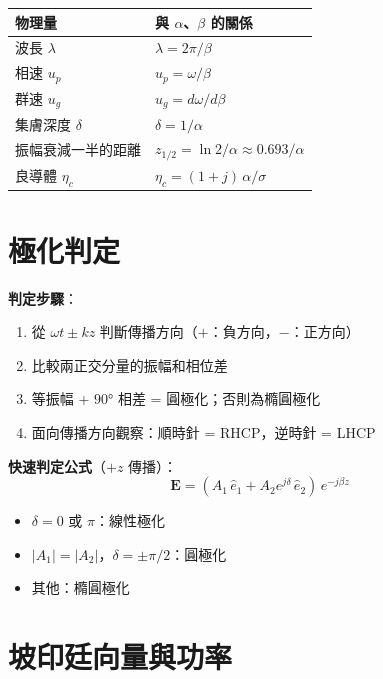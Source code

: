 \documentclass[12pt,a4paper]{article}
\newcommand{\vE}{\mathbf{E}}
\begin{document}
\begin{formulabox}
\begin{center}
\begin{tabular}{ll}
\toprule
\textbf{物理量} & \textbf{與 $\alpha$、$\beta$ 的關係} \\
\midrule
波長 $\lambda$ & $\lambda = 2\pi/\beta$ \\
相速 $u_p$ & $u_p = \omega/\beta$ \\
群速 $u_g$ & $u_g = d\omega/d\beta$ \\
集膚深度 $\delta$ & $\delta = 1/\alpha$ \\
振幅衰減一半的距離 & $z_{1/2} = \ln 2 / \alpha \approx 0.693/\alpha$ \\
良導體 $\eta_c$ & $\eta_c = (1+j)\,\alpha/\sigma$ \\
\bottomrule
\end{tabular}
\end{center}
\end{formulabox}

\section{極化判定}

\begin{formulabox}[極化公式]
\textbf{判定步驟}：
\begin{enumerate}
  \item 從 $\omega t \pm kz$ 判斷傳播方向（$+$：負方向，$-$：正方向）
  \item 比較兩正交分量的振幅和相位差
  \item 等振幅 + $90°$ 相差 = 圓極化；否則為橢圓極化
  \item 面向傳播方向觀察：順時針 = RHCP，逆時針 = LHCP
\end{enumerate}

\textbf{快速判定公式}（$+z$ 傳播）：
\[
  \vE = (A_1\,\hat{e}_1 + A_2 e^{j\delta}\,\hat{e}_2)\,e^{-j\beta z}
\]
\begin{itemize}
  \item $\delta = 0$ 或 $\pi$：線性極化
  \item $|A_1| = |A_2|$，$\delta = \pm\pi/2$：圓極化
  \item 其他：橢圓極化
\end{itemize}
\end{formulabox}

\section{坡印廷向量與功率}
\end{document}
